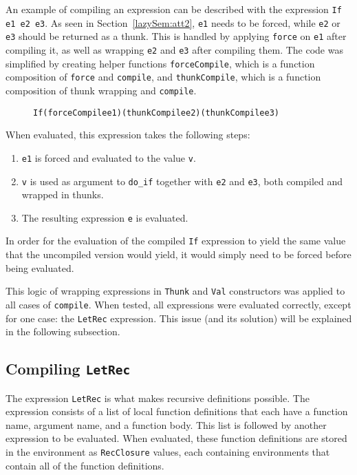 An example of compiling an expression can be described with the expression
\texttt{If e1 e2 e3}. As seen in Section~\ref{lazySem:att2}, \texttt{e1} needs
to be forced, while \texttt{e2} or \texttt{e3} should be returned as a thunk.
This is handled by applying \texttt{force} on \texttt{e1} after compiling it,
as well as wrapping \texttt{e2} and \texttt{e3} after compiling them.
The code was simplified by creating helper functions \texttt{forceCompile},
which is a function composition of \texttt{force} and \texttt{compile}, and
\texttt{thunkCompile}, which is a function composition of thunk wrapping and
\texttt{compile}.

\begin{figure}[H]
\begin{alltt}
  If (forceCompile e1) (thunkCompile e2) (thunkCompile e3)
\end{alltt}
\end{figure}

\noindent When evaluated, this expression takes the following steps:

\begin{enumerate}
\item \texttt{e1} is forced and evaluated to the value \texttt{v}.
\item \texttt{v} is used as argument to \texttt{do\_if} together with \texttt{e2} and \texttt{e3}, both compiled and wrapped in thunks.
\item The resulting expression \texttt{e} is evaluated.
\end{enumerate}

\noindent In order for the evaluation of the compiled \texttt{If} expression to
yield the same value that the uncompiled version would yield, it would simply
need to be forced before being evaluated.

This logic of wrapping expressions in \texttt{Thunk} and \texttt{Val}
constructors was applied to all cases of \texttt{compile}. When tested, all
expressions were evaluated correctly, except for one case: the \texttt{LetRec}
expression. This issue (and its solution) will be explained in the following
subsection.

\subsection{Compiling \texttt{LetRec}}
The expression \texttt{LetRec} is what makes recursive definitions possible.
The expression consists of a list of local function definitions that each have a
function name, argument name, and a function body. This list is followed by
another expression to be evaluated. When evaluated, these function definitions
are stored in the environment as \texttt{RecClosure} values, each containing
environments that contain all of the function definitions.

